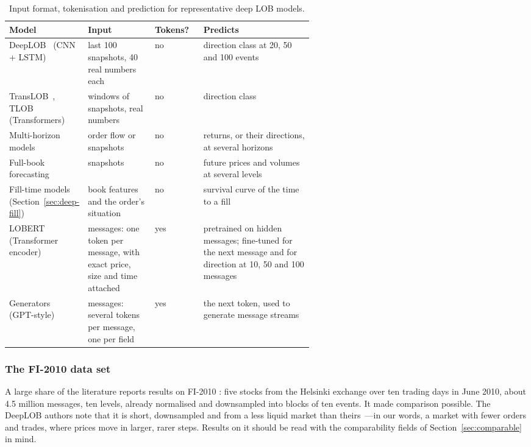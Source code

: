 \begin{table}[!htbp]
\centering\footnotesize
\caption{Input format, tokenisation and prediction for representative deep LOB models.}
\label{tab:input-output-kinds}
\setlength{\tabcolsep}{3pt}
\begin{tabularx}{\linewidth}{>{\raggedright\arraybackslash}p{0.2\linewidth}>{\raggedright\arraybackslash}p{0.22\linewidth}>{\raggedright\arraybackslash}p{0.16\linewidth}>{\raggedright\arraybackslash}X}
\toprule
Model & Input & Tokens? & Predicts \\
\midrule
DeepLOB~\citep{zhang2019} (CNN + LSTM) & last 100 snapshots, 40 real numbers each & no & direction class at 20, 50 and 100 events \\
TransLOB~\citep{wallbridge2020}, TLOB~\citep{berti2025tlob} (Transformers) & windows of snapshots, real numbers & no & direction class \\
Multi-horizon models~\citep{kolm2023,zhangzohren2021} & order flow or snapshots & no & returns, or their directions, at several horizons \\
Full-book forecasting~\citep{arxiv240902277} & snapshots & no & future prices and volumes at several levels \\
Fill-time models (Section~\ref{sec:deep-fill}) & book features and the order's situation & no & survival curve of the time to a fill \\
LOBERT~\citep{linna2025lobert} (Transformer encoder) & messages: one token per message, with exact price, size and time attached & yes & pretrained on hidden messages; fine-tuned for the next message and for direction at 10, 50 and 100 messages \\
Generators~\citep{nagy2023,wheeler2024marketgpt} (GPT-style) & messages: several tokens per message, one per field & yes & the next token, used to generate message streams \\
\bottomrule
\end{tabularx}
\end{table}

\subsubsection{The FI-2010 data set}
\label{sec:deep-io-fi2010}

A large share of the literature reports results on FI-2010
\citep{ntakaris2018}: five stocks from the Helsinki exchange over ten trading days in June 2010,
about 4.5 million messages, ten levels, already normalised and downsampled into blocks of ten
events. It made comparison possible. The DeepLOB authors
note that it is short, downsampled and from a less liquid market than theirs~\citep{zhang2019}---in our words, a market with
fewer orders and trades, where prices move in larger, rarer steps. Results on it should be read with the comparability fields of
Section~\ref{sec:comparable} in mind.

